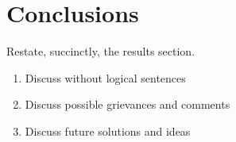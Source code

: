 \documentclass[12pt]{article}
\begin{document}
\section{Conclusions}
	Restate, succinctly, the results section.
	\begin{enumerate}
		\item Discuss without logical sentences
		\item Discuss possible grievances and comments
		\item Discuss future solutions and ideas
	\end{enumerate}	 

 
\end{document}
